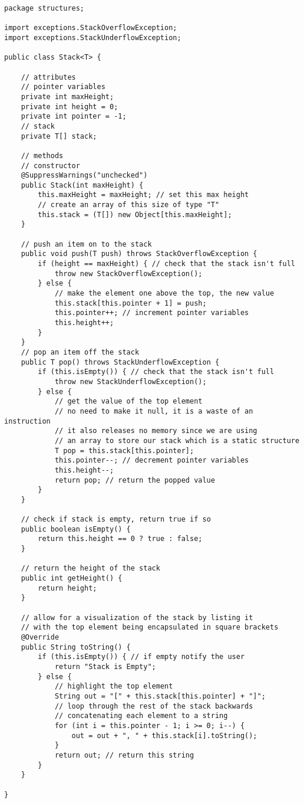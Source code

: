 \documentclass[../../../../main.tex]{subfiles}
\begin{document}
\begin{verbatim}
package structures;

import exceptions.StackOverflowException;
import exceptions.StackUnderflowException;

public class Stack<T> {

	// attributes
	// pointer variables
	private int maxHeight;
	private int height = 0;
	private int pointer = -1;
	// stack
	private T[] stack;

	// methods
	// constructor
	@SuppressWarnings("unchecked")
	public Stack(int maxHeight) {
		this.maxHeight = maxHeight; // set this max height
		// create an array of this size of type "T"
		this.stack = (T[]) new Object[this.maxHeight];
	}
	
	// push an item on to the stack
	public void push(T push) throws StackOverflowException {
		if (height == maxHeight) { // check that the stack isn't full
			throw new StackOverflowException();
		} else {
			// make the element one above the top, the new value
			this.stack[this.pointer + 1] = push;
			this.pointer++; // increment pointer variables
			this.height++;
		}
	}
	// pop an item off the stack
	public T pop() throws StackUnderflowException {
		if (this.isEmpty()) { // check that the stack isn't full
			throw new StackUnderflowException();
		} else {
			// get the value of the top element
			// no need to make it null, it is a waste of an instruction
			// it also releases no memory since we are using
			// an array to store our stack which is a static structure
			T pop = this.stack[this.pointer];
			this.pointer--; // decrement pointer variables
			this.height--;
			return pop; // return the popped value
		}
	}

	// check if stack is empty, return true if so
	public boolean isEmpty() {
		return this.height == 0 ? true : false;
	}

	// return the height of the stack
	public int getHeight() {
		return height;
	}

	// allow for a visualization of the stack by listing it
	// with the top element being encapsulated in square brackets
	@Override
	public String toString() {
		if (this.isEmpty()) { // if empty notify the user
			return "Stack is Empty";
		} else {
			// highlight the top element
			String out = "[" + this.stack[this.pointer] + "]";
			// loop through the rest of the stack backwards
			// concatenating each element to a string
			for (int i = this.pointer - 1; i >= 0; i--) {
				out = out + ", " + this.stack[i].toString();
			}
			return out; // return this string
		}
	}

}
\end{verbatim}
\end{document}
